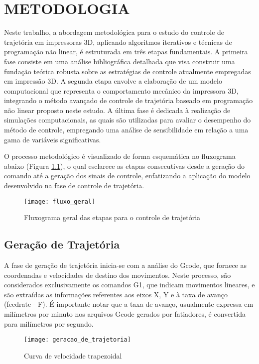 \chapter{METODOLOGIA}
Neste trabalho, a abordagem metodológica para o estudo do controle de trajetória em impressoras 3D, aplicando algoritmos iterativos e técnicas de programação não linear, é estruturada em três etapas fundamentais. A primeira fase consiste em uma análise bibliográfica detalhada que visa construir uma fundação teórica robusta sobre as estratégias de controle atualmente empregadas em impressão 3D. A segunda etapa envolve a elaboração de um modelo computacional que representa o comportamento mecânico da impressora 3D, integrando o método avançado de controle de trajetória baseado em programação não linear proposto neste estudo. A última fase é dedicada à realização de simulações computacionais, as quais são utilizadas para avaliar o desempenho do método de controle, empregando uma análise de sensibilidade em relação a uma gama de variáveis significativas.

O processo metodológico é visualizado de forma esquemática no fluxograma abaixo (Figura \ref{fig:fluxo_geral}), o qual esclarece as etapas consecutivas desde a geração do comando até a geração dos sinais de controle, enfatizando a aplicação do modelo desenvolvido na fase de controle de trajetória.

\begin{figure}[H]
    \centering
    \caption{Fluxograma geral das etapas para o controle de trajetória}
    \texttt{[image: fluxo\_geral]}

    \label{fig:fluxo_geral}
\end{figure}

\section{Geração de Trajetória}

A fase de geração de trajetória inicia-se com a análise do Gcode, que fornece as coordenadas e velocidades de destino dos movimentos. Neste processo, são considerados exclusivamente os comandos G1, que indicam movimentos lineares, e são extraídas as informações referentes aos eixos X, Y e à taxa de avanço (feedrate - F). É importante notar que a taxa de avanço, usualmente expressa em milímetros por minuto nos arquivos Gcode gerados por fatiadores, é convertida para milímetros por segundo.

\begin{figure}[H]
    \centering
    \caption{Curva de velocidade trapezoidal}
    \texttt{[image: geracao\_de\_trajetoria]}

    \label{fig:geracao_de_trajetoria}
\end{figure}

